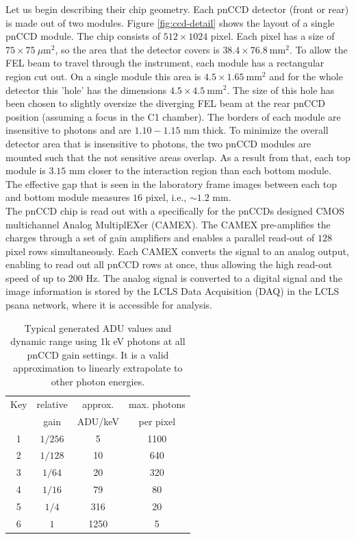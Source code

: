 Let us begin describing their chip geometry. Each pnCCD detector (front or rear) is made out of two modules. Figure \ref{fig:ccd-detail} shows the layout of a single pnCCD module. The chip consists of $512 \times 1024$ pixel. Each pixel has a size of $75 \times 75\ \mu \mathrm{m}^2$, so the area that the detector covers is $38.4 \times 76.8\ \mathrm{mm}^{2}$. To allow the FEL beam to travel through the instrument, each module has a rectangular region cut out. On a single module this area is $4.5 \times 1.65\ \mathrm{mm}^{2}$ and for the whole detector this 'hole' has the dimensions $4.5 \times 4.5\ \mathrm{mm}^{2}$. The size of this hole has been chosen to slightly oversize the diverging FEL beam at the rear pnCCD position (assuming a focus in the C1 chamber). The borders of each module are insensitive to photons and are $1.10 - 1.15$ mm thick. To minimize the overall detector area that is insensitive to photons, the two pnCCD modules are mounted such that the not sensitive areas overlap. As a result from that, each top module is $3.15$ mm closer to the interaction region than each bottom module. The effective gap that is seen in the laboratory frame images between each top and bottom module measures $16$ pixel, i.e., $\sim 1.2$ mm.\\
The pnCCD chip is read out with a specifically for the pnCCDs designed CMOS multichannel Analog MultiplEXer (CAMEX). The CAMEX pre-amplifies the charges through a set of gain amplifiers and enables a parallel read-out of $128$ pixel rows simultaneously. Each CAMEX converts the signal to an analog output, enabling to read out all pnCCD rows at once, thus allowing the high read-out speed of up to $200$ Hz. The analog signal is converted to a digital signal and the image information is stored by the LCLS Data Acquisition (DAQ) in the LCLS psana network, where it is accessible for analysis.\\
\begin{table}%
\centering
\begin{tabular}{ |c c c c |}
 \hline
 Key & relative  & approx.  & max. photons \\ 
     &   gain    & ADU/keV  & per pixel  \\
 \hline
 1 & $1/256$ & 5 & 1100  \\
 2 & $1/128$ & 10 & 640   \\
 3 & $1/64$ & 20 & 320   \\
 4 & $1/16$ & 79 & 80  \\
 5 & $1/4$ & 316 & 20  \\
 6 & $1$ & 1250 & 5  \\
 \hline
\end{tabular}
\caption[pnCCD gain modes and typical ADU values at 1k eV photons.]{Typical generated ADU values and dynamic range using 1k eV photons at all pnCCD gain settings. It is a valid approximation to linearly extrapolate to other photon energies.}
\label{tab:gain-modes}
\end{table}

